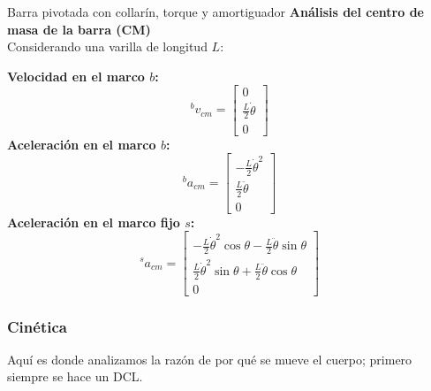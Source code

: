 \begin{solucion}{Barra pivotada con collarín, torque y amortiguador}
\textbf{Análisis del centro de masa de la barra (CM)}\\
Considerando una varilla de longitud $L$:

\textbf{Velocidad en el marco $b$:}
$$
{}^b v_{cm} = \begin{bmatrix} 0 \\ \frac{L}{2} \dot{\theta} \\ 0 \end{bmatrix}
$$
\textbf{Aceleración en el marco $b$:}
$$
{}^b a_{cm} = \begin{bmatrix} -\frac{L}{2} \dot{\theta}^2 \\ \frac{L}{2} \ddot{\theta} \\ 0 \end{bmatrix}
$$
\textbf{Aceleración en el marco fijo $s$:}
$$
{}^s a_{cm} =
\begin{bmatrix}
    -\frac{L}{2} \dot{\theta}^2 \cos \theta - \frac{L}{2} \ddot{\theta} \sin \theta \\
    \frac{L}{2} \dot{\theta}^2 \sin \theta + \frac{L}{2} \ddot{\theta} \cos \theta \\
    0
\end{bmatrix}
$$

\subsubsection*{Cinética}
Aquí es donde analizamos la razón de por qué se mueve el cuerpo; primero siempre se hace un DCL.


\end{solucion}
